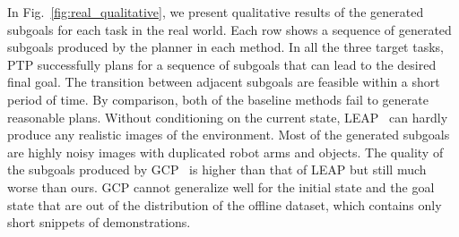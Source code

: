 In Fig.~\ref{fig:real_qualitative}, we present qualitative results of the generated subgoals for each task in the real world. Each row shows a sequence of generated subgoals produced by the planner in each method. In all the three target tasks, PTP successfully plans for a sequence of subgoals that can lead to the desired final goal. The transition between adjacent subgoals are feasible within a short period of time. By comparison, both of the baseline methods fail to generate reasonable plans. Without conditioning on the current state, LEAP~\cite{Nasiriany2019PlanningWG} can hardly produce any realistic images of the environment. Most of the generated subgoals are highly noisy images with duplicated robot arms and objects. The quality of the subgoals produced by GCP~\cite{Pertsch2020LongHorizonVP} is higher than that of LEAP but still much worse than ours. GCP cannot generalize well for the initial state and the goal state that are out of the distribution of the offline dataset, which contains only short snippets of demonstrations.